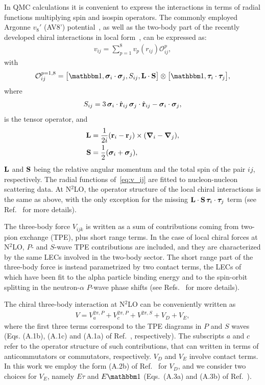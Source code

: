 \documentclass[aps,prc,twocolumn,superscriptaddress,floatfix]{revtex4-1}
\begin{document}
In QMC calculations it is convenient to express the interactions
in terms of radial functions multiplying spin and isospin operators. The commonly 
employed Argonne $v_8'$ (AV8') potential~\cite{Wiringa:2002}, as well as the two-body
part of the recently developed chiral interactions in local form~\cite{Gezerlis:2013}, 
can be expressed as:
\begin{align}
	v_{ij} = \sum_{p=1}^8 v_p(r_{ij}) \mathcal O_{ij}^{p},
	\label{eq:v_ij}
\end{align}
with
\begin{align}
	\mathcal O_{ij}^{p=1,8} = \big[\mathbbm 1,\bm\sigma_i\cdot\bm\sigma_j,S_{ij},\vb{L}\cdot\vb{S}\big]
	\otimes\big[\mathbbm 1,\bm\tau_i\cdot\bm\tau_j\big],
\end{align}
where
\begin{align}
	S_{ij}=3\,\bm\sigma_i\cdot\hat{\vb{r}}_{ij}\,\bm\sigma_j\cdot\hat{\vb{r}}_{ij}-\bm\sigma_i\cdot\bm\sigma_j,
\end{align}
is the tensor operator, and
\begin{align}
	\vb{L}&=\frac{1}{2i}(\vb{r}_i-\vb{r}_j)\times(\bm\nabla_i-\bm\nabla_j), \label{eq:L} \\
	\vb{S}&=\frac{1}{2}(\bm\sigma_i+\bm\sigma_j), \label{eq:S}
\end{align}
$\vb{L}$ and $\vb{S}$ being the relative angular momentum and the total spin of the pair $ij$, respectively.
The radial functions of~\cref{eq:v_ij} are fitted to nucleon-nucleon scattering data.
At N$^2$LO, the operator structure of the local chiral interactions is the same as 
above, with the only exception for the missing $\vb{L}\cdot\vb{S}\,\bm\tau_i\cdot\bm\tau_j$ term
(see Ref.~\cite{Gezerlis:2014} for more details).

The three-body force $V_{ijk}$ is written as a sum of contributions coming from two-pion
exchange (TPE), plus short range terms. In the case of local chiral forces at N$^2$LO, $P$- and $S$-wave
TPE contributions are included, and they are characterized by the same LECs involved in the two-body sector. 
The short range part of the three-body force is instead parametrized by two contact terms, 
the LECs of which have been fit to the alpha particle binding energy and to the spin-orbit splitting in 
the neutron-$\alpha$ $P$-wave phase shifts (see Refs.~\cite{Lynn:2016,Lynn:2017} for more details).

The chiral three-body interaction at N$^2$LO can be conveniently written as
\begin{align}
V=V_a^{2\pi,P}+V_c^{2\pi,P}+V^{2\pi,S}+V_D+V_E,
\label{eq:v_ijk}
\end{align}
where the first three terms correspond to the TPE diagrams in $P$ and $S$ waves (Eqs. (A.1b),
(A.1c) and (A.1a) of Ref.~\cite{Lynn:2017}, respectively). The subscripts $a$ and $c$ refer 
to the operator structure of such contributions, that can written in terms of anticommutators 
or commutators, respectively. $V_D$ and $V_E$ involve contact terms. In this work we employ
the form (A.2b) of Ref.~\cite{Lynn:2017} for $V_D$, and we consider two choices for $V_E$, 
namely $E\tau$ and $E\mathbbm1$ (Eqs.~(A.3a) and (A.3b) of Ref.~\cite{Lynn:2017}).
\end{document}
